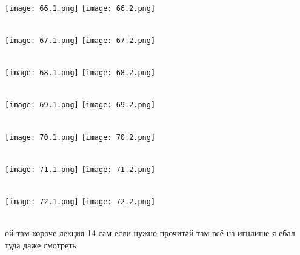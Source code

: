 \documentclass[a4paper,14pt]{extreport}
\begin{document}
\begin{landscape}
\hypertarget{32v}{}\\[1cm]
\texttt{[image: 66.1.png]}
\texttt{[image: 66.2.png]}

\hypertarget{33v}{}\\[1cm]
\texttt{[image: 67.1.png]}
\texttt{[image: 67.2.png]}

\hypertarget{34v}{}\\[1cm]
\texttt{[image: 68.1.png]}
\texttt{[image: 68.2.png]}

\hypertarget{35v}{}\\[1cm]
\texttt{[image: 69.1.png]}
\texttt{[image: 69.2.png]}

\hypertarget{36v}{}\\[1cm]
\texttt{[image: 70.1.png]}
\texttt{[image: 70.2.png]}

\hypertarget{37v}{}\\[1cm]
\texttt{[image: 71.1.png]}
\texttt{[image: 71.2.png]}

\hypertarget{38v}{}\\[1cm]
\texttt{[image: 72.1.png]}
\texttt{[image: 72.2.png]}

\hypertarget{39v}{}\\[1cm]
ой там короче лекция 14 сам если нужно прочитай там всё на игнлише я ебал  туда даже смотреть


\end{landscape}
\end{document}
